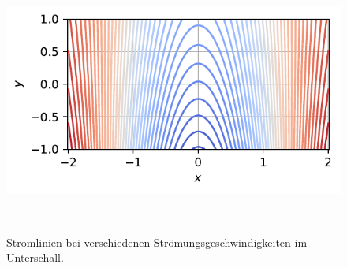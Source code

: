 \begin{figure}
\begin{minipage}[b]{0.32\textwidth}
        \caption*{$\beta = 0.81$ ; $U = 200 \frac{\mathrm{m}}{\mathrm{s}}$}
    \end{minipage}
    \hfill
    \begin{minipage}[b]{0.32\textwidth}
        \centering
        \includegraphics[width=\linewidth]{papers/ueberschall/figures/abklingen_340.pdf}
        \caption*{$\beta = 0$ ; $U = a$}
    \end{minipage}
    \caption{Stromlinien bei verschiedenen Strömungsgeschwindigkeiten im Unterschall.}
~\label{fig:abklingen_stromlinie}
\end{figure}

